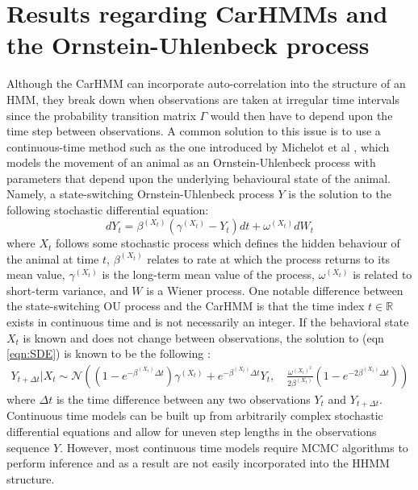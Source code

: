 
\section{Results regarding CarHMMs and the Ornstein-Uhlenbeck process}


Although the CarHMM can incorporate auto-correlation into the structure of an HMM, they break down when observations are taken at irregular time intervals since the probability transition matrix $\Gamma$ would then have to depend upon the time step between observations. A common solution to this issue is to use a continuous-time method such as the one introduced by Michelot et al \cite{Michelot:2019}, which models the movement of an animal as an Ornstein-Uhlenbeck process with parameters that depend upon the underlying behavioural state of the animal. Namely, a state-switching Ornstein-Uhlenbeck process $Y$ is the solution to the following stochastic differential equation:
%
\begin{equation}
    \label{eqn:SDE}
    dY_t = \beta^{(X_t)}(\gamma^{(X_t)} - Y_t)dt + \omega^{(X_t)} dW_t
\end{equation}
%
where $X_t$ follows some stochastic process which defines the hidden behaviour of the animal at time $t$, $\beta^{(X_t)}$ relates to rate at which the process returns to its mean value, $\gamma^{(X_t)}$ is the long-term mean value of the process, $\omega^{(X_t)}$ is related to short-term variance, and $W$ is a Wiener process. One notable difference between the state-switching OU process and the CarHMM is that the time index $t \in \mathbb{R}$ exists in continuous time and is not necessarily an integer. If the behavioral state $X_t$ is known and does not change between observations, the solution to (eqn \ref{eqn:SDE}) is known to be the following \cite{Michelot:2019}:
%
\begin{align}
Y_{t+\Delta t} | X_{t} \sim \mathcal{N}\left((1-e^{-\beta^{(X_t)}\Delta t})\gamma^{(X_t)} + e^{-\beta^{(X_t)}\Delta t} Y_t,\quad \frac{\omega^{(X_t)^2}}{2\beta^{(X_t)}} (1-e^{-2\beta^{(X_t)}\Delta t})\right)
\label{eqn:OU_sol}
\end{align}
%
where $\Delta t$ is the time difference between any two observations $Y_t$ and $Y_{t+\Delta t}$. Continuous time models can be built up from arbitrarily complex stochastic differential equations and allow for uneven step lengths in the observations sequence $Y$. However, most continuous time models require MCMC algorithms to perform inference and as a result are not easily incorporated into the HHMM structure.

